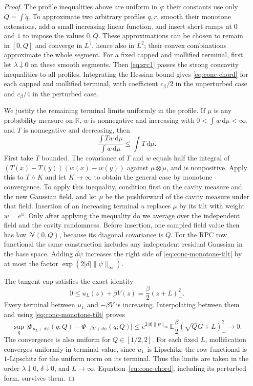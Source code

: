 \documentclass[11pt,a4paper]{article}
\numberwithin{equation}{section}
\theoremstyle{definition}
\theoremstyle{remark}
\newcommand{\E}{\mathbb E}
\newcommand{\R}{\mathbb R}
\newcommand{\dd}{\mathrm d}
\newcommand{\cN}{\mathcal N}
\begin{document}
\begin{proof}
The profile inequalities above are uniform in $\dot q$: their constants
use only $Q=\int\dot q$.  To approximate two arbitrary profiles $q,r$,
smooth their monotone extensions, add a small increasing linear function,
and insert short ramps at $0$ and $1$ to impose the values $0,Q$.
These approximations can be chosen to remain in $[0,Q]$ and converge
in $L^1$, hence also in $L^2$; their convex combinations approximate
the whole segment.  For a fixed capped and mollified terminal, first let
$\lambda\downarrow0$ on these smooth segments.  Then
\eqref{eq:src1} passes the strong concavity inequalities to all profiles.
Integrating the Hessian bound gives \eqref{eq:conc-chord} for each capped
and mollified terminal, with coefficient $c_\beta/2$ in the unperturbed
case and $c_\beta/4$ in the perturbed case.

We justify the remaining terminal limits uniformly in the profile.
If $\mu$ is any probability measure on $\R$, $w$ is nonnegative and
increasing with $0<\int w\,\dd\mu<\infty$, and $T$ is nonnegative and
decreasing, then
\begin{equation}
 \frac{\int Tw\,\dd\mu}{\int w\,\dd\mu}\leq\int T\,\dd\mu.
 \label{eq:conc-monotone-tilt}
\end{equation}
First take $T$ bounded.  The covariance of $T$ and $w$ equals half the integral of
$(T(x)-T(y))(w(x)-w(y))$ against $\mu\otimes\mu$, and is nonpositive.
Apply this to $T\wedge K$ and let $K\to\infty$ to obtain the general
case by monotone convergence.
To apply this inequality, condition first on the cavity measure and the
new Gaussian field, and let $\mu$ be the pushforward of the cavity measure
under that field.  Insertion of an increasing terminal $u$ replaces
$\mu$ by its tilt with weight $w=e^u$.  Only after applying the inequality
do we average over the independent field and the cavity randomness.
Before insertion, one sampled field value then has law $\cN(0,Q)$,
because its diagonal covariance is $Q$.  For the RPC row functional the
same construction includes any independent residual Gaussian in the base
space.  Adding $d\psi$ increases the right side of
\eqref{eq:conc-monotone-tilt} by at most the factor
$\exp(2|d|\|\psi\|_\infty)$.

The tangent cap satisfies the exact identity
\[
 0\leq u_L(z)+\beta V(z)=\frac\beta2(z+L)_-^2.
\]
Every terminal between $u_L$ and $-\beta V$ is increasing.  Interpolating
between them and using \eqref{eq:conc-monotone-tilt} proves
\begin{equation}
 \sup_q\big|\Phi_{u_L+d\psi}(q;Q)
              -\Phi_{-\beta V+d\psi}(q;Q)\big|
 \leq e^{2|d|\|\psi\|_\infty}
       \E\frac\beta2(\sqrt Q G+L)_-^2\longrightarrow0.
 \label{eq:conc-cap-limit}
\end{equation}
The convergence is also uniform for $Q\in[1/2,2]$.
For each fixed $L$, mollification converges uniformly in terminal value,
since $u_L$ is Lipschitz; the row functional is $1$-Lipschitz for the
uniform norm on its terminal.  Thus the limits are taken in the order
$\lambda\downarrow0$, $\delta\downarrow0$, and $L\to\infty$.
Equation~\eqref{eq:conc-chord}, including its perturbed form, survives them.


\end{proof}
\end{document}
